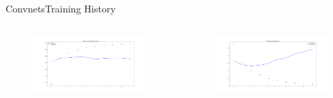 \documentclass{beamer}
\begin{document}
\begin{frame}{Convnets}{Training History}

  \begin{columns}
    \begin{column}{0.5\textwidth}
      \begin{figure}[ht]
        \centering
        \includegraphics[width=1.2\textwidth]{convnet_training}
      \end{figure}

    \end{column}
    \begin{column}{0.5\textwidth}
      \begin{figure}[ht]
        \centering
        \includegraphics[width=1.2\textwidth]{convnet_loss}
      \end{figure}

    \end{column}
  \end{columns}

\end{frame}
\end{document}
